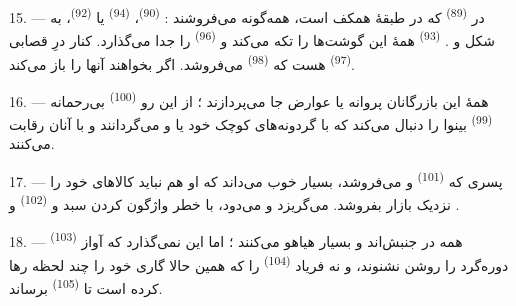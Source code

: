 15. --- در  \textsuperscript{(89)} که در طبقهٔ همکف است،
همه‌گونه  می‌فروشند : 
\textsuperscript{(90)}،  \textsuperscript{(94)} یا
 \textsuperscript{(92)}، به شکل  و . 
\textsuperscript{(93)} همهٔ این گوشت‌ها را تکه می‌کند و
 \textsuperscript{(96)} را جدا می‌گذارد. کنار
درِ قصابی  \textsuperscript{(97)} هست که
 \textsuperscript{(98)} می‌فروشد. اگر بخواهند
آنها را باز می‌کند.

16. --- همهٔ این بازرگانان پروانه یا عوارض جا می‌پردازند ؛ از این رو
 \textsuperscript{(100)} بی‌رحمانه  \textsuperscript{(99)} بینوا را دنبال می‌کند که با
گردونه‌های کوچک خود  یا
 و
 می‌گردانند و با آنان رقابت می‌کنند.

\VUsaut{4.0mm}
\VUsaut{3.0mm}

17. --- پسری که  \textsuperscript{(101)} و 
می‌فروشد، بسیار خوب می‌داند که او هم نباید کالاهای خود را نزدیک بازار
بفروشد. می‌گریزد و می‌دود، با خطر واژگون کردن سبد  و  
\textsuperscript{(102)}  و .

18. --- همه در جنبش‌اند و بسیار هیاهو می‌کنند ؛ اما این نمی‌گذارد که
آواز  \textsuperscript{(103)} دوره‌گرد را روشن نشنوند،
و نه فریاد  \textsuperscript{(104)} را که همین حالا
گاری خود را چند لحظه رها کرده است تا 
\textsuperscript{(105)} برساند.

\VUsaut{6.0mm}
\VUfilet{22mm}
